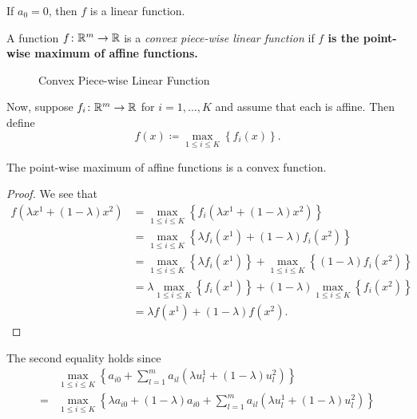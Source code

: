 \begin{remark}
	If \(a_0 = 0\), then \(f\) is a linear function.
\end{remark}

\begin{definition}
	A function \(f\colon \mathbb{\MakeUppercase{R}}^{m}\to \mathbb{\MakeUppercase{R}}\) is a \emph{convex piece-wise linear function} if
	\textbf{\(f\) is the point-wise maximum of affine functions.}
\end{definition}

\begin{figure}[H]
	\centering
	\caption{Convex Piece-wise Linear Function}
	\label{fig:convex-piecewise-linear-function}
\end{figure}

Now, suppose \(f_{i}\colon \mathbb{\MakeUppercase{R}}^m \to \mathbb{\MakeUppercase{R}}\) for \(i = 1, \ldots , K\) and assume that each is affine. Then define
\[
	f(x)\coloneqq \max_{1\leq i\leq K} \left\{ f_i(x) \right\}.
\]

\begin{theorem}
	The point-wise maximum of affine functions is a convex function.
\end{theorem}

\begin{proof}
	We see that
	\[
		\begin{split}
			f(\lambda x^1 + (1 - \lambda)x^2) &=\max_{1\leq i\leq K}\left\{ f_i(\lambda x^1 + (1 - \lambda)x^2) \right\}\\
			&=\max_{1\leq i\leq K}\left\{ \lambda f_{i}(x^1) + (1 - \lambda)f_{i}(x^2) \right\}\\
			&=\max_{1\leq i\leq K}\left\{ \lambda f_{i}(x^1)\right\} + \max_{1\leq i\leq K}\left\{(1 - \lambda)f_{i}(x^2) \right\}\\
			&=\lambda\max_{1\leq i\leq K}\left\{f_{i}(x^1)\right\} + (1 - \lambda)\max_{1\leq i\leq K}\left\{f_{i}(x^2) \right\}\\
			&= \lambda f(x^1)+(1 - \lambda)f(x^2).
		\end{split}
	\]
\end{proof}

\begin{remark}
	The second equality holds since
	\[
		\begin{split}
			&\max_{1\leq i\leq K}\left\{ a_{i0}+\sum\limits_{l=1}^{m} a_{il}(\lambda u^1_l + (1 - \lambda)u^2_l) \right\}\\
			= &\max_{1\leq i\leq K}\left\{ \lambda a_{i0}+(1 - \lambda)a_{i0} + \sum\limits_{l=1}^{m} a_{il}(\lambda u^1_l + (1 - \lambda)u^2_l) \right\}
		\end{split}
	\]
\end{remark}
